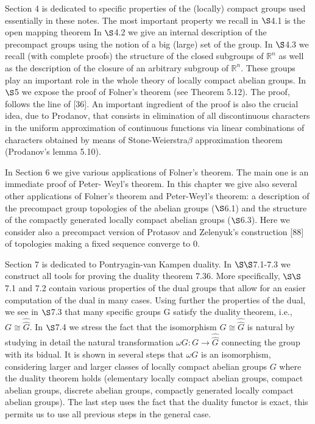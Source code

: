 \documentclass[12pt]{article}
\begin{document}
        Section 4 is dedicated to specific properties of the (locally) compact groups used essentially in these notes.
    The most important property we recall in $ \S $4.1 is the open mapping theorem In $ \S $4.2 we give an internal
    description of the precompact groups using the notion of a big (large) set of the group. In $ \S $4.3 we recall
    (with complete proofs) the structure of the closed subgroups of $ \mathbb{R}^n $ as well as the description of the closure of an
    arbitrary subgroup of $ \mathbb{R}^n $. These groups play an important role in the whole theory of locally compact abelian
    groups. In $ \S $5 we expose the proof of Folner's theorem (see Theorem 5.12). The proof, follows the line of [36].
    An important ingredient of the proof is also the crucial idea, due to Prodanov, that consists in elimination of
    all discontinuous characters in the uniform approximation of continuous functions via linear combinations of
    characters obtained by means of Stone-Weierstra$\beta$ approximation theorem (Prodanov's lemma 5.10).


        In Section 6 we give various applications of Folner's theorem. The main one is an immediate proof of Peter-
    Weyl's theorem. In this chapter we give also several other applications of Folner's theorem and Peter-Weyl's
    theorem: a description of the precompact group topologies of the abelian groups ($ \S $6.1) and the structure of
    the compactly generated locally compact abelian groups ($ \S $6.3). Here we consider also a precompact version of
    Protasov and Zelenyuk's construction [88] of topologies making a fixed sequence converge to 0.


        Section 7 is dedicated to Pontryagin-van Kampen duality. In $ \S\S $7.1-7.3 we construct all tools for proving the
    duality theorem 7.36. More specifically, $ \S\S $7.1 and 7.2 contain various properties of the dual groups that allow
    for an easier computation of the dual in many cases. Using further the properties of the dual, we see in $ \S $7.3 that
    many specific groups G satisfy the duality theorem, i.e., $ G \cong \widehat{\widehat{G}} $. In $ \S $7.4 we stress the fact that the isomorphism
    $ G \cong \widehat{\widehat{G}} $ is natural by studying in detail the natural transformation $ \omega G : G \to \widehat{\widehat{G}} $ connecting the group with
    its bidual. It is shown in several steps that $ \omega G $ is an isomorphism, considering larger and larger classes of
    locally compact abelian groups $ G $ where the duality theorem holds (elementary locally compact abelian groups,
    compact abelian groups, discrete abelian groups, compactly generated locally compact abelian groups). The
    last step uses the fact that the duality functor is exact, this permits us to use all previous steps in the general
    case.
    
\end{document}
